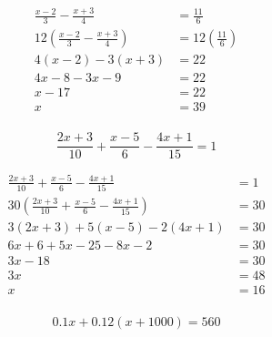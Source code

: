 \documentclass[letterpaper, landscape]{exam}
\begin{document}
\begin{questions}
      \begin{solution}
        \begin{align*}
          \frac{x - 2}{3} - \frac{x + 3}{4}                   & = \frac{11}{6} \\
          12 \left( \frac{x - 2}{3} - \frac{x + 3}{4} \right) & = 12 \left( \frac{11}{6} \right) \\
          4(x - 2) - 3(x + 3)                                 & = 22 \\
          4x - 8 - 3x - 9                                     & = 22 \\
          x - 17                                              & = 22 \\
          x                                                   & = 39 \\
        \end{align*}
      \end{solution}

    \question[10]
      \[ 
        \frac{2x + 3}{10} + \frac{x - 5}{6} - \frac{4x + 1}{15} = 1 
      \]

      \begin{solution}
        \begin{align*}
          \frac{2x + 3}{10} + \frac{x - 5}{6} - \frac{4x + 1}{15}                   & = 1  \\
          30 \left( \frac{2x + 3}{10} + \frac{x - 5}{6} - \frac{4x + 1}{15} \right) & = 30  \\
          3(2x + 3) + 5(x - 5) - 2(4x + 1)                                          & = 30  \\
          6x + 6 + 5x - 25 - 8x - 2                                                 & = 30  \\
          3x - 18                                                                   & = 30  \\
          3x                                                                        & = 48  \\
          x                                                                         & = 16  \\
        \end{align*}
      \end{solution}

    \question[10]\label{e:last}
      \[ 
        0.1x + 0.12(x + 1000) = 560 
      \]


\end{questions}
\end{document}
